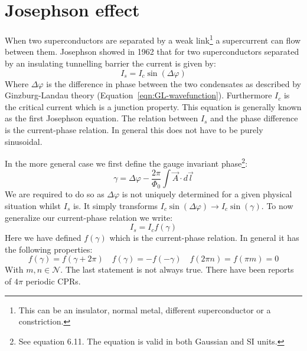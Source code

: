 \section{Josephson effect}
\label{sec:josephson-effect}
When two superconductors are separated by a weak link\footnote{This can be an insulator, normal metal, different superconductor or a constriction.} a supercurrent can flow between them. Josephson showed in 1962 that for two superconductors separated by an insulating tunnelling barrier the current is given by\cite{tinkhamIntroductionSuperconductivity}:
\begin{equation}
	I_s = I_c \sin(\Delta \varphi)
	\label{eqn:1st-josephson-relation}
\end{equation}
Where $\Delta \varphi$ is the difference in phase between the two condensates as described by Ginzburg-Landau theory (Equation~\ref{eqn:GL-wavefunction}). Furthermore $I_c$ is the critical current which is a junction property. This equation is generally known as the first Josephson equation. The relation between $I_s$ and the phase difference is the current-phase relation. In general this does not have to be purely sinusoidal.\cite{golubovCurrentphaseRelationJosephson2004a}

In the more general case we first define the gauge invariant phase\footnote{See  equation 6.11. The equation is valid in both Gaussian and SI units.}:
\begin{equation}
	\gamma = \Delta \varphi - \frac{2\pi}{\Phi_0}\int \vec{A} \cdot d\vec{l}
	\label{eqn:gauge-invariant-phase}
\end{equation}
We are required to do so as $\Delta \varphi$ is not uniquely determined for a given physical situation whilst $I_s$ is.\cite{tinkhamIntroductionSuperconductivity} It simply transforms $I_c \sin(\Delta \varphi) \to I_c \sin(\gamma)$. To now generalize our current-phase relation we write:
\begin{equation}
	I_s = I_c f(\gamma)
\end{equation}
Here we have defined $f(\gamma)$ which is the current-phase relation. In general it has the following properties\cite{golubovCurrentphaseRelationJosephson2004a}:
\begin{equation}
	f(\gamma) = f(\gamma + 2\pi) \quad f(\gamma) = -f(-\gamma) \quad f(2\pi n) = f(\pi m) = 0
\end{equation}
With $m,n \in \mathcal{N}$. The last statement is not always true. There have been reports of $4\pi$ periodic CPRs.\cite{endresCurrentPhaseRelation2023}


